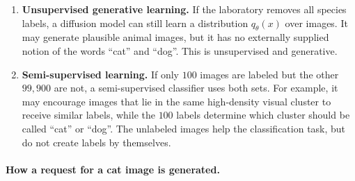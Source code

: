 \documentclass[11pt,a4paper]{article}
\theoremstyle{definition}
\begin{document}
\begin{example}
\begin{enumerate}
    \item \textbf{Unsupervised generative learning.} If the laboratory removes all species
    labels, a diffusion model can still learn a distribution $q_\theta(x)$ over images.
    It may generate plausible animal images, but it has no externally supplied notion of
    the words ``cat'' and ``dog''. This is unsupervised and generative.

    \item \textbf{Semi-supervised learning.} If only $100$ images are labeled but the other
    $99{,}900$ are not, a semi-supervised classifier uses both sets. For example, it may
    encourage images that lie in the same high-density visual cluster to receive similar
    labels, while the $100$ labels determine which cluster should be called ``cat'' or
    ``dog''. The unlabeled images help the classification task, but do not create labels by
    themselves.
\end{enumerate}

\paragraph{How a request for a cat image is generated.}
\label{ex:supervised-cat-generation}
\begin{center}
\end{center}
\end{example}
\end{document}
